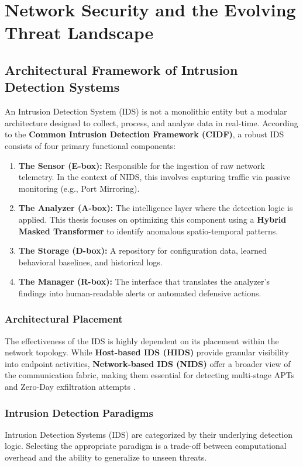 \documentclass[12pt, a4paper]{report}
\begin{document}
\chapter{Network Security and the Evolving Threat Landscape}



\section{Architectural Framework of Intrusion Detection Systems}
An Intrusion Detection System (IDS) is not a monolithic entity but a modular architecture designed to collect, process, and analyze data in real-time. According to the \textbf{Common Intrusion Detection Framework (CIDF)}, a robust IDS consists of four primary functional components:

\begin{enumerate}
    \item \textbf{The Sensor (E-box):} Responsible for the ingestion of raw network telemetry. In the context of NIDS, this involves capturing traffic via passive monitoring (e.g., Port Mirroring).
    \item \textbf{The Analyzer (A-box):} The intelligence layer where the detection logic is applied. This thesis focuses on optimizing this component using a \textbf{Hybrid Masked Transformer} to identify anomalous spatio-temporal patterns.
    \item \textbf{The Storage (D-box):} A repository for configuration data, learned behavioral baselines, and historical logs.
    \item \textbf{The Manager (R-box):} The interface that translates the analyzer's findings into human-readable alerts or automated defensive actions.
\end{enumerate}

\subsection{Architectural Placement}
The effectiveness of the IDS is highly dependent on its placement within the network topology. While \textbf{Host-based IDS (HIDS)} provide granular visibility into endpoint activities, \textbf{Network-based IDS (NIDS)} offer a broader view of the communication fabric, making them essential for detecting multi-stage APTs and Zero-Day exfiltration attempts \cite{khraisat2019survey}.


\subsection{Intrusion Detection Paradigms}
Intrusion Detection Systems (IDS) are categorized by their underlying detection logic. Selecting the appropriate paradigm is a trade-off between computational overhead and the ability to generalize to unseen threats.
\end{document}

